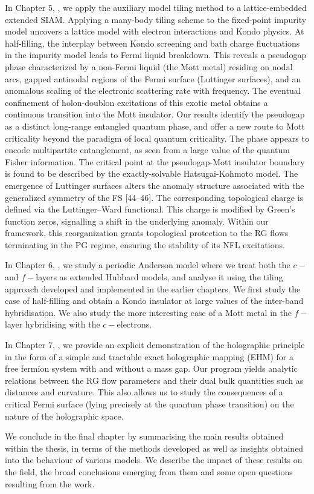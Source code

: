 In Chapter 5, \hyperref[sec:tileESIAM]{\it \chapE}, we apply the auxiliary model tiling method to a lattice-embedded extended SIAM. Applying a many-body tiling scheme to the fixed-point impurity model uncovers a lattice model with electron interactions and Kondo physics. At half-filling, the interplay between Kondo screening and bath charge fluctuations in the impurity model leads to Fermi liquid breakdown. This reveals a pseudogap phase characterized by a non-Fermi liquid (the Mott metal) residing on nodal arcs, gapped antinodal regions of the Fermi surface (Luttinger surfaces), and an anomalous scaling of the electronic scattering rate with frequency. The eventual confinement of holon-doublon excitations of this exotic metal obtains a continuous transition into the Mott insulator. Our results identify the pseudogap as a distinct long-range entangled quantum phase, and offer a new route to Mott criticality beyond the paradigm of local quantum criticality. The phase appears to encode multipartite entanglement, as seen from a large value of the quantum Fisher information. The critical point at the pseudogap-Mott insulator boundary is found to be described by the exactly-solvable Hatsugai-Kohmoto model. The emergence of Luttinger surfaces alters the anomaly structure associated with the generalized symmetry of the FS [44–46]. The corresponding topological charge is defined via the Luttinger–Ward functional. This charge is modified by Green’s function zeros, signalling a shift in the underlying anomaly. Within our framework, this reorganization grants topological protection to the RG flows terminating in the PG regime, ensuring the stability of its NFL excitations. 

In Chapter 6, \hyperref[sec:tileHF]{\it \chapF}, we study a periodic Anderson model where we treat both the \(c-\) and \(f-\)layers as extended Hubbard models, and analyse it using the tiling approach developed and implemented in the earlier chapters. We first study the case of half-filling and obtain a Kondo insulator at large values of the inter-band hybridisation. We also study the more interesting case of a Mott metal in the \(f-\)layer hybridising with the \(c-\)electrons.

In Chapter 7, \hyperref[sec:Metals]{\it \chapG}, we provide an explicit demonstration of the holographic principle in the form of a simple and tractable exact holographic mapping (EHM) for a free fermion system with and without a mass gap. Our program yields analytic relations between the RG flow parameters and their dual bulk quantities such as distances and curvature. This also allows us to study the consequences of a critical Fermi surface (lying precisely at the quantum phase transition) on the nature of the holographic space.

We conclude in the final chapter by summarising the main results obtained within the thesis, in terms of the methods developed as well as insights obtained into the behaviour of various models. We describe the impact of these results on the field, the broad conclusions emerging from them and some open questions resulting from the work.
